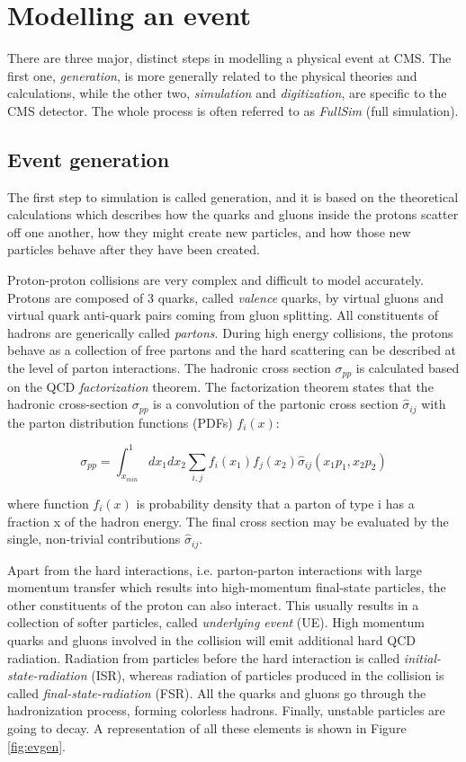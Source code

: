 \section{Modelling an event} \label{sec:modelling}

There are three major, distinct steps in modelling a physical event at CMS. The first one,  \emph{generation}, is more generally related to the physical theories and calculations, while the other two, \emph{simulation} and \emph{digitization}, are specific to the CMS detector. The whole process is often referred to as \emph{FullSim} (full simulation).

\subsection{Event generation}

The first step to simulation is called generation, and it is based on the theoretical calculations which describes how the quarks and gluons inside the protons scatter off one another, how they might create new particles, and how those new particles behave after they have been created. 

Proton-proton collisions are very complex and difficult to model accurately. Protons are
composed of 3 quarks, called \emph{valence} quarks, by virtual gluons and virtual quark anti-quark
pairs coming from gluon splitting. All constituents of hadrons are generically called \emph{partons}.
During high energy collisions, the protons behave as a collection of free partons and the
hard scattering can be described at the level of parton interactions. The hadronic cross
section $\sigma_{pp}$ is calculated based on the QCD \emph{factorization} theorem. The factorization theorem
states that the hadronic cross-section $\sigma_{pp}$ is a convolution of the partonic cross section  $\hat{\sigma}_{ij}$ with the parton distribution functions (PDFs) $f_i(x)$:

\[
\sigma_{pp} = \int_{x_{min}}^1 dx_1 dx_2 \sum_{i,j}f_i(x_1)f_j(x_2)\hat{\sigma}_{ij}(x_1 p_1, x_2 p_2)
\]

where function $f_i(x)$ is probability density that a parton of type i has a fraction x of the
hadron energy. The final cross section may be evaluated by the single, non-trivial contributions $\hat{\sigma}_{ij}$.

Apart from the hard interactions, i.e. parton-parton interactions with large momentum transfer which results into high-momentum final-state particles, the other constituents of the proton can also interact. This
usually results in a collection of softer particles, called \emph{underlying event} (UE). High momentum quarks and gluons involved in the collision will emit additional hard QCD radiation. Radiation
from particles before the hard interaction is called \emph{initial-state-radiation} (ISR), whereas radiation of particles produced in the collision is called \emph{final-state-radiation} (FSR). All the quarks
and gluons go through the hadronization process, forming colorless hadrons. Finally, unstable particles are going to decay. A representation of all these elements is shown in Figure \ref{fig:evgen}.          

